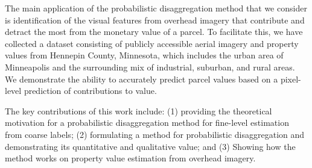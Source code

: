 \documentclass[10pt,twocolumn,a4paper]{article}
\begin{document}
The main application of the probabilistic disaggregation method that we consider is identification of the visual features from overhead imagery that contribute and detract the most from the monetary value of a parcel. To facilitate this, we have collected a dataset consisting of publicly accessible aerial imagery and property values from Hennepin County, Minnesota, which includes the urban area of Minneapolis and the surrounding mix of industrial, suburban, and rural areas. We demonstrate the ability to accurately predict parcel values based on a pixel-level prediction of contributions to value. 

The key contributions of this work include: (1) providing the theoretical motivation for a probabilistic disaggregation method for fine-level estimation from coarse labels; (2) formulating a method for probabilistic disaggregation and demonstrating its quantitative and qualitative value; and (3) Showing how the method works on property value estimation from overhead imagery.


\end{document}

